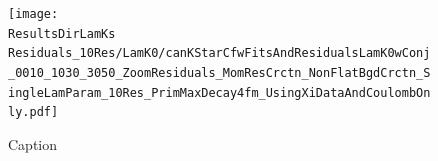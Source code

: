 \documentclass[../AnalysisNoteJBuxton.tex]{subfiles}
\begin{document}

\begin{figure}[h]
  \centering
  \texttt{[image: \\ResultsDirLamKs Residuals\_10Res/LamK0/canKStarCfwFitsAndResidualsLamK0wConj\_0010\_1030\_3050\_ZoomResiduals\_MomResCrctn\_NonFlatBgdCrctn\_SingleLamParam\_10Res\_PrimMaxDecay4fm\_UsingXiDataAndCoulombOnly.pdf]}
  \caption[Small Caption]{Caption}
  \label{fig:LamK0wConjFitsAndResiduals_10Res}
\end{figure}
\end{document}
